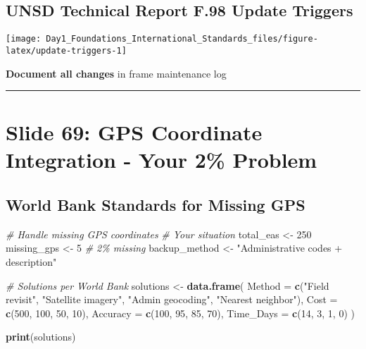 \documentclass[
]{article}
\newenvironment{Shaded}{\begin{snugshade}}{\end{snugshade}}
\newcommand{\AttributeTok}[1]{\textcolor[rgb]{0.13,0.29,0.53}{#1}}
\newcommand{\CommentTok}[1]{\textcolor[rgb]{0.56,0.35,0.01}{\textit{#1}}}
\newcommand{\DecValTok}[1]{\textcolor[rgb]{0.00,0.00,0.81}{#1}}
\newcommand{\FunctionTok}[1]{\textcolor[rgb]{0.13,0.29,0.53}{\textbf{#1}}}
\newcommand{\NormalTok}[1]{#1}
\newcommand{\OtherTok}[1]{\textcolor[rgb]{0.56,0.35,0.01}{#1}}
\newcommand{\StringTok}[1]{\textcolor[rgb]{0.31,0.60,0.02}{#1}}
\begin{document}
\subsection{UNSD Technical Report F.98 Update
Triggers}\label{unsd-technical-report-f.98-update-triggers}

\texttt{[image: Day1\_Foundations\_International\_Standards\_files/figure-latex/update-triggers-1]}

\textbf{Document all changes} in frame maintenance log

\begin{center}\rule{0.5\linewidth}{0.5pt}\end{center}

\section{Slide 69: GPS Coordinate Integration - Your 2\%
Problem}\label{slide-69-gps-coordinate-integration---your-2-problem}

\subsection{World Bank Standards for Missing
GPS}\label{world-bank-standards-for-missing-gps}

\begin{Shaded}
\begin{Highlighting}[]
\CommentTok{\# Handle missing GPS coordinates}
\CommentTok{\# Your situation}
\NormalTok{total\_eas }\OtherTok{\textless{}{-}} \DecValTok{250}
\NormalTok{missing\_gps }\OtherTok{\textless{}{-}} \DecValTok{5}  \CommentTok{\# 2\% missing}
\NormalTok{backup\_method }\OtherTok{\textless{}{-}} \StringTok{"Administrative codes + description"}

\CommentTok{\# Solutions per World Bank}
\NormalTok{solutions }\OtherTok{\textless{}{-}} \FunctionTok{data.frame}\NormalTok{(}
  \AttributeTok{Method =} \FunctionTok{c}\NormalTok{(}\StringTok{"Field revisit"}\NormalTok{, }\StringTok{"Satellite imagery"}\NormalTok{, }
             \StringTok{"Admin geocoding"}\NormalTok{, }\StringTok{"Nearest neighbor"}\NormalTok{),}
  \AttributeTok{Cost =} \FunctionTok{c}\NormalTok{(}\DecValTok{500}\NormalTok{, }\DecValTok{100}\NormalTok{, }\DecValTok{50}\NormalTok{, }\DecValTok{10}\NormalTok{),}
  \AttributeTok{Accuracy =} \FunctionTok{c}\NormalTok{(}\DecValTok{100}\NormalTok{, }\DecValTok{95}\NormalTok{, }\DecValTok{85}\NormalTok{, }\DecValTok{70}\NormalTok{),}
  \AttributeTok{Time\_Days =} \FunctionTok{c}\NormalTok{(}\DecValTok{14}\NormalTok{, }\DecValTok{3}\NormalTok{, }\DecValTok{1}\NormalTok{, }\DecValTok{0}\NormalTok{)}
\NormalTok{)}

\FunctionTok{print}\NormalTok{(solutions)}
\end{Highlighting}
\end{Shaded}
\end{document}
